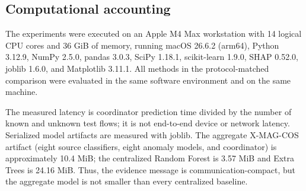 \subsection{Computational accounting}

The experiments were executed on an Apple M4 Max workstation with 14 logical CPU cores and 36 GiB of memory, running macOS 26.6.2 (arm64), Python 3.12.9, NumPy 2.5.0, pandas 3.0.3, SciPy 1.18.1, scikit-learn 1.9.0, SHAP 0.52.0, joblib 1.6.0, and Matplotlib 3.11.1. All methods in the protocol-matched comparison were evaluated in the same software environment and on the same machine.

The measured latency is coordinator prediction time divided by the number of known and unknown test flows; it is not end-to-end device or network latency. Serialized model artifacts are measured with joblib. The aggregate X-MAG-COS artifact (eight source classifiers, eight anomaly models, and coordinator) is approximately 10.4 MiB; the centralized Random Forest is 3.57 MiB and Extra Trees is 24.16 MiB. Thus, the evidence message is communication-compact, but the aggregate model is not smaller than every centralized baseline.
